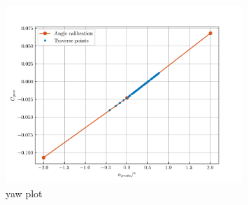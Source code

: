 \documentclass{article}
\begin{document}
\begin{figure}[H]
    \centering
    \includegraphics[width=0.8\textwidth]{figures/yaw_plot.png}
    \caption{yaw plot}
    \label{fig:yaw_plot}
\end{figure}
\end{document}
